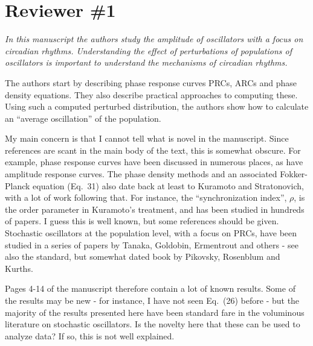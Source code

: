 \documentclass[11pt, letterpaper]{article}
\newenvironment{reviewer}{\itshape\color{gray}}{}
\begin{document}
\section*{Reviewer \#1}
\begin{reviewer}
In this manuscript the authors study the amplitude of oscillators with a focus on circadian rhythms.
Understanding the effect of perturbations of populations of oscillators is important to understand the mechanisms of circadian rhythms.
 
The authors start by describing phase response curves PRCs, ARCs and phase density equations.
They also describe practical approaches to computing these.
Using such a computed perturbed distribution, the authors show how to calculate an ``average oscillation'' of the population.

My main concern is that I cannot tell what is novel in the manuscript.
Since references are scant in the main body of the text, this is somewhat obscure.
For example, phase response curves have been discussed in numerous places, as have amplitude response curves.
The phase density methods and an associated Fokker-Planck equation (Eq.~31) also date back at least to Kuramoto and Stratonovich, with a lot of work following that.
For instance, the ``synchronization index'', $\rho$, is the order parameter in Kuramoto's treatment, and has been studied in hundreds of papers.
I guess this is well known, but some references should be given.
Stochastic oscillators at the population level, with a focus on PRCs, have been studied in a series of papers by Tanaka, Goldobin, Ermentrout and others - see also the standard, but somewhat dated book by Pikovsky, Rosenblum and Kurths.

Pages 4-14 of the manuscript therefore contain a lot of known results.
Some of the results may be new - for instance, I have not seen Eq.~(26) before - but the majority of the results presented here have been standard fare in the voluminous literature on stochastic oscillators.
Is the novelty here that these can be used to analyze data? If so, this is not well explained.
\end{reviewer}
\end{document}
